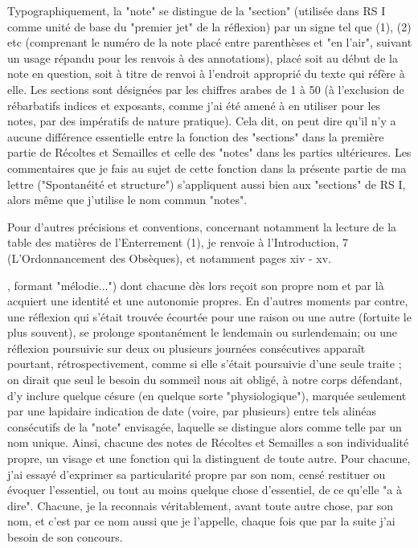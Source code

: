 {Typographiquement, la "note" se distingue de la "section" (utilisée dans RS I comme unité de base du "premier jet" de la réflexion) par un signe tel que (1), (2) etc (comprenant le numéro de la note placé entre parenthèses et "en l'air", suivant un usage répandu pour les renvois à des annotations), placé soit au début de la note en question, soit à titre de renvoi à l'endroit approprié du texte qui réfère à elle. Les sections sont désignées par les chiffres arabes de 1 à 50 (à l'exclusion de rébarbatifs indices et exposants, comme j'ai été amené à en utiliser pour les notes, par des impératifs de nature pratique). Cela dit, on peut dire qu'il n'y a aucune différence essentielle entre la fonction des "sections" dans la première partie de Récoltes et Semailles et celle des "notes" dans les parties ultérieures. Les commentaires que je fais au sujet de cette fonction dans la présente partie de ma lettre ("Spontanéité et structure") s'appliquent aussi bien aux "sections" de RS I, alors même que j'utilise le nom commun "notes".

Pour d'autres précisions et conventions, concernant notamment la lecture de la table des matières de l'Enterrement (1), je renvoie à l'Introduction, 7 (L'Ordonnancement des Obsèques), et notamment pages xiv - xv.}, formant "mélodie...") dont chacune dès lors reçoit son propre nom et par là acquiert une identité et une autonomie propres. En d'autres moments par contre, une réflexion qui s'était trouvée écourtée pour une raison ou une autre (fortuite le plus souvent), se prolonge spontanément le lendemain ou surlendemain; ou une réflexion poursuivie sur deux ou plusieurs journées consécutives apparaît pourtant, rétrospectivement, comme si elle s'était poursuivie d'une seule traite ; on dirait que seul le besoin du sommeil nous ait obligé, à notre corps défendant, d'y inclure quelque césure (en quelque sorte "physiologique"), marquée seulement par une lapidaire indication de date (voire, par plusieurs) entre tels alinéas consécutifs de la "note" envisagée, laquelle se distingue alors comme telle par un nom unique.
Ainsi, chacune des notes de Récoltes et Semailles a son individualité propre, un visage et une fonction qui la distinguent de toute autre. Pour chacune, j'ai essayé d'exprimer sa particularité propre par son nom, censé restituer ou évoquer l'essentiel, ou tout au moins quelque chose d'essentiel, de ce qu'elle "a à dire". Chacune, je la reconnais véritablement, avant toute autre chose, par son nom, et c'est par ce nom aussi que je l'appelle, chaque fois que par la suite j'ai besoin de son concours.

